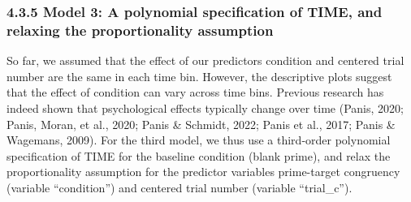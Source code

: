 \documentclass[
  man,floatsintext]{apa6}
\begin{document}
\subsubsection{4.3.5 Model 3: A polynomial specification of TIME, and relaxing the proportionality assumption}\label{model-3-a-polynomial-specification-of-time-and-relaxing-the-proportionality-assumption}

So far, we assumed that the effect of our predictors condition and centered trial number are the same in each time bin. However, the descriptive plots suggest that the effect of condition can vary across time bins. Previous research has indeed shown that psychological effects typically change over time (Panis, 2020; Panis, Moran, et al., 2020; Panis \& Schmidt, 2022; Panis et al., 2017; Panis \& Wagemans, 2009).
For the third model, we thus use a third-order polynomial specification of TIME for the baseline condition (blank prime), and relax the proportionality assumption for the predictor variables prime-target congruency (variable ``condition'') and centered trial number (variable ``trial\_c'').

\scriptsize
\end{document}
